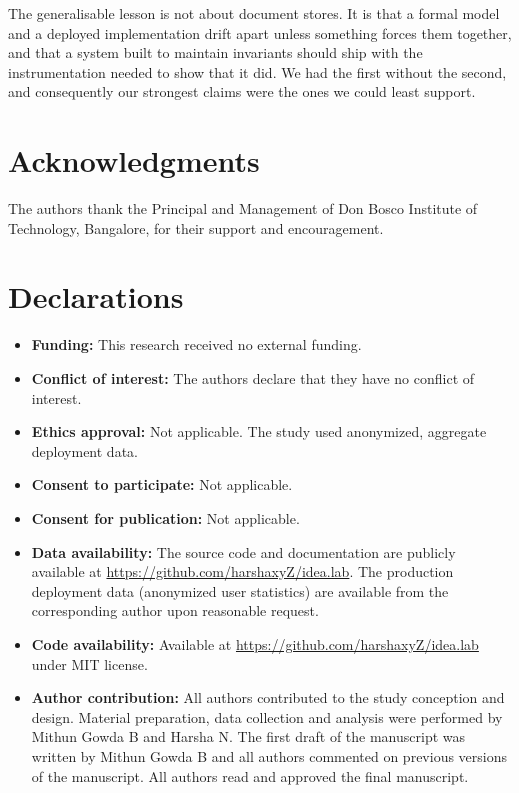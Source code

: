 \documentclass[11pt,a4paper]{article}
\theoremstyle{plain}
\theoremstyle{definition}
\theoremstyle{remark}
\begin{document}
The generalisable lesson is not about document stores. It is that a formal model and a deployed implementation drift apart unless something forces them together, and that a system built to maintain invariants should ship with the instrumentation needed to show that it did. We had the first without the second, and consequently our strongest claims were the ones we could least support.


\section*{Acknowledgments}

The authors thank the Principal and Management of Don Bosco Institute of Technology, Bangalore, for their support and encouragement.

\section*{Declarations}

\begin{itemize}[noitemsep,topsep=3pt]
    \item \textbf{Funding:} This research received no external funding.
    \item \textbf{Conflict of interest:} The authors declare that they have no conflict of interest.
    \item \textbf{Ethics approval:} Not applicable. The study used anonymized, aggregate deployment data.
    \item \textbf{Consent to participate:} Not applicable.
    \item \textbf{Consent for publication:} Not applicable.
    \item \textbf{Data availability:} The source code and documentation are publicly available at \url{https://github.com/harshaxyZ/idea.lab}. The production deployment data (anonymized user statistics) are available from the corresponding author upon reasonable request.
    \item \textbf{Code availability:} Available at \url{https://github.com/harshaxyZ/idea.lab} under MIT license.
    \item \textbf{Author contribution:} All authors contributed to the study conception and design. Material preparation, data collection and analysis were performed by Mithun Gowda B and Harsha N. The first draft of the manuscript was written by Mithun Gowda B and all authors commented on previous versions of the manuscript. All authors read and approved the final manuscript.
\end{itemize}



\end{document}
